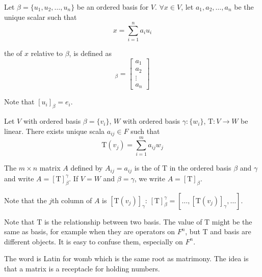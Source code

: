 \begin{definition}
	Let $\beta = \{u_1, u_2, \dots, u_n \}$ be an ordered basis for $V$. $\forall x \in V$, let $a_1, a_2, \dots, a_n$ be the unique scalar such that
	\begin{equation*}
		x = \sum_{i=1}^n a_i u_i
	\end{equation*}
	
	the   of $x$ relative to $\beta$, is defined as 
	\begin{equation}
		[x]_\beta = \left [
		\begin{matrix}
		a_1 \\
		a_2 \\
		\vdots \\
		a_n
		\end{matrix}
		\right ]
	\end{equation}
	
	Note that $[u_i]_\beta = e_i$.
\end{definition}

\begin{definition}
	Let $V$ with ordered basis $\beta=\{ v_i \}$, $W$ with ordered basis $\gamma:\{w_i\}$, $\mathrm{T}:V \rightarrow W$ be linear. There exists unique scala $a_{ij} \in F$ such that
	\begin{equation}
		\mathrm{T}(v_j) = \sum_{i=1}^m a_{ij} w_j
	\end{equation}
	
	The $m \times n$ matrix $A$ defined by $A_{ij}=a_{ij}$ is the   of $\mathrm{T}$ in the ordered basis $\beta$ and $\gamma$ and write $A=[\mathrm{T}]_\beta^\gamma$. If $V = W$ and $\beta = \gamma$, we write $A=[\mathrm{T}]_\beta$.
\end{definition}

	Note that the $j$th column of $A$ is $[\mathrm{T}(v_j)]_\gamma$: $[\mathrm{T}]_\beta^\gamma = [\dots, [\mathrm{T}(v_j)]_\gamma, \dots ]$.
	
	Note that $\mathrm{T}$ is the relationship between two basis. The value of $\mathrm{T}$ might be the same as basis, for example when they are operators on $F^n$, but $\mathrm{T}$ and basis are different objects. It is easy to confuse them, especially on $F^n$.
	

\begin{definition}
  The word  is Latin for womb which is the same root as matrimony. The idea is that a matrix is a receptacle for holding numbers.   
\end{definition}




